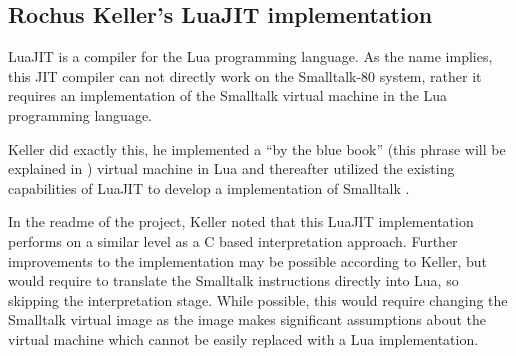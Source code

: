\subsection{Rochus Keller's LuaJIT implementation}
LuaJIT is a \jit{} compiler for the Lua programming language. As the name implies, this JIT compiler can not directly work on the Smalltalk-80 system, rather it requires an implementation of the Smalltalk virtual machine in the Lua programming language.

Keller did exactly this, he implemented a \enquote{by the blue book} (this phrase will be explained in ) virtual machine in Lua and thereafter utilized the existing capabilities of LuaJIT to develop a \jit{} implementation of Smalltalk \cite{Keller2021}.

In the readme of the project, Keller noted that this LuaJIT implementation performs on a similar level as a C\+\+ based interpretation approach. 
Further improvements to the implementation may be possible according to Keller, but would require to translate the Smalltalk instructions directly into Lua, so skipping the interpretation stage. While possible, this would require changing the Smalltalk virtual image as the image makes significant assumptions about the virtual machine which cannot be easily replaced with a Lua implementation.
